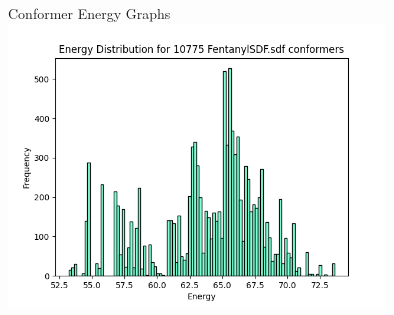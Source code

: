\documentclass[aspectratio=169]{beamer}
\begin{document}
\begin{frame}{Conformer Energy Graphs}
\includegraphics[width=10cm]{img/Graphs/FentanylSDF_Energy_Histogram.png}
\end{frame}
\end{document}
